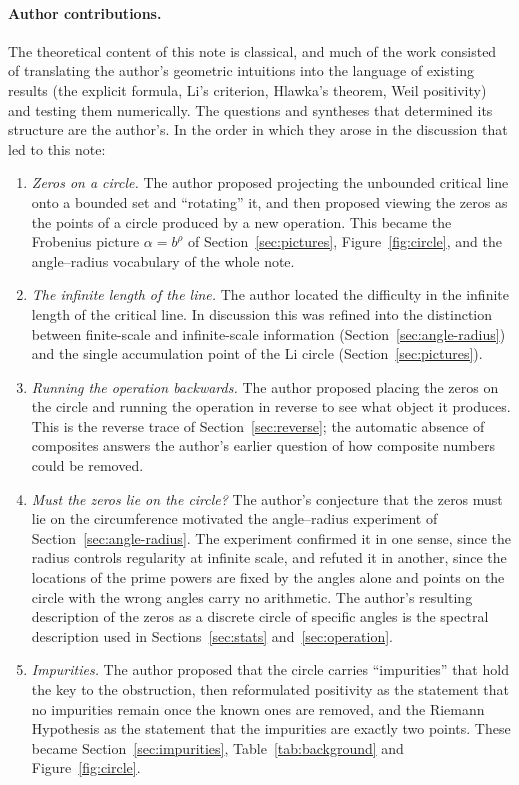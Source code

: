 \documentclass[11pt,a4paper]{article}
\theoremstyle{definition}\newtheorem{definition}[proposition]{Definition}
\theoremstyle{remark}\newtheorem{remark}[proposition]{Remark}
\begin{document}
\paragraph{Author contributions.} The theoretical content of this note is classical, and much of the work consisted of translating the author's geometric intuitions into the language of existing results (the explicit formula, Li's criterion, Hlawka's theorem, Weil positivity) and testing them numerically. The questions and syntheses that determined its structure are the author's. In the order in which they arose in the discussion that led to this note:
\begin{enumerate}[label=(\arabic*),itemsep=1pt]
\item \emph{Zeros on a circle.} The author proposed projecting the unbounded critical line onto a bounded set and ``rotating'' it, and then proposed viewing the zeros as the points of a circle produced by a new operation. This became the Frobenius picture $\alpha=b^\rho$ of Section~\ref{sec:pictures}, Figure~\ref{fig:circle}, and the angle--radius vocabulary of the whole note.
\item \emph{The infinite length of the line.} The author located the difficulty in the infinite length of the critical line. In discussion this was refined into the distinction between finite-scale and infinite-scale information (Section~\ref{sec:angle-radius}) and the single accumulation point of the Li circle (Section~\ref{sec:pictures}).
\item \emph{Running the operation backwards.} The author proposed placing the zeros on the circle and running the operation in reverse to see what object it produces. This is the reverse trace of Section~\ref{sec:reverse}; the automatic absence of composites answers the author's earlier question of how composite numbers could be removed.
\item \emph{Must the zeros lie on the circle?} The author's conjecture that the zeros must lie on the circumference motivated the angle--radius experiment of Section~\ref{sec:angle-radius}. The experiment confirmed it in one sense, since the radius controls regularity at infinite scale, and refuted it in another, since the locations of the prime powers are fixed by the angles alone and points on the circle with the wrong angles carry no arithmetic. The author's resulting description of the zeros as a discrete circle of specific angles is the spectral description used in Sections~\ref{sec:stats} and~\ref{sec:operation}.
\item \emph{Impurities.} The author proposed that the circle carries ``impurities'' that hold the key to the obstruction, then reformulated positivity as the statement that no impurities remain once the known ones are removed, and the Riemann Hypothesis as the statement that the impurities are exactly two points. These became Section~\ref{sec:impurities}, Table~\ref{tab:background} and Figure~\ref{fig:circle}.

\end{enumerate}
\end{document}
